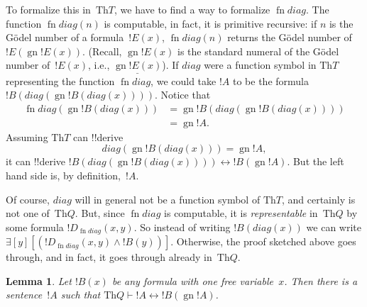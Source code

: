 \documentclass[10pt,a4paper]{article}
\theoremstyle{plain}
\newtheorem{lem}[thm]{Lemma}
\theoremstyle{definition}
\theoremstyle{remark}
\newenvironment{explain}{}{}
\newcommand*{\ollabel}[1]{\label{#1}}
\providecommand{\lexists}{\mathord{\exists}}
\providecommand{\Proves}{\mathrel{\vdash}}
\providecommand{\Obj}{}
\providecommand{\Th}{\ensuremath{\mathrm{Th}}}
\providecommand{\num}[1]{\underline{#1}}
\providecommand{\Gn}{\operatorname{gn}}
\providecommand{\gn}{\operatorname{gn}}
\providecommand{\liff}{\mathbin{\leftrightarrow}}
\providecommand{\fn}{\operatorname{fn}}
\providecommand{\fn}{\operatorname{fn}}
\begin{document}
\begin{explain}
To formalize this in~$\Th{T}$, we have to find a way to formalize
$\fn{diag}$. The function $\fn{diag}(n)$ is computable, in fact, it is
primitive recursive: if $n$ is the G\"odel number of a
formula~$!E(x)$, $\fn{diag}(n)$ returns the G\"odel number
of~$!E(\gn{!E(x)})$. (Recall, $\gn{!E(x)}$ is the standard numeral of
the G\"odel number of~$!E(x)$, i.e., $\num{\Gn{!E(x)}}$). If
$\Obj{diag}$ were a function symbol in $\Th{T}$ representing the
function $\fn{diag}$, we could take $!A$ to be the formula
$!B(\Obj{diag}(\gn{!B(\Obj{diag}(x))}))$. Notice that
\begin{align*}
\fn{diag}(\Gn{!B(\Obj{diag}(x))}) & = 
\Gn{!B(\Obj{diag}(\gn{!B(\Obj{diag}(x))}))} \\
& = \Gn{!A}.
\end{align*}
Assuming $\Th{T}$ can !!{derive}
\[
\Obj{diag}(\gn{!B(\Obj{diag}(x))}) = \gn{!A},
\]
it can !!{derive} $!B(\Obj{diag}(\gn{!B(\Obj{diag}(x))}))
\liff !B(\gn{!A})$. But the left hand side is, by
definition,~$!A$.

Of course, $\Obj{diag}$ will in general not be a function symbol of
$\Th{T}$, and certainly is not one of~$\Th{Q}$. But, since $\fn{diag}$
is computable, it is \emph{representable} in~$\Th{Q}$ by some formula
$!D_{\fn{diag}}(x,y)$. So instead of writing $!B(\Obj{diag}(x))$ we
can write $\lexists[y][(!D_{\fn{diag}}(x,y) \land !B(y))]$. Otherwise,
the proof sketched above goes through, and in fact, it goes through
already in~$\Th{Q}$.
\end{explain}

\begin{lem}
\ollabel{lem:fixed-point} Let $!B(x)$ be any formula with one free
variable~$x$. Then there is a sentence~$!A$ such that $\Th{Q} \Proves
!A \liff !B(\gn{!A})$.
\end{lem}
\end{document}
